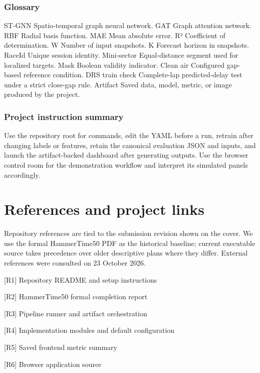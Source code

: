 \documentclass[11pt,a4paper,oneside]{report}
\begin{document}
\subsection*{Glossary}

ST-GNN  Spatio-temporal graph neural network. GAT  Graph attention network. RBF  Radial basis function. MAE  Mean absolute error. R²  Coefficient of determination. W  Number of input snapshots. K  Forecast horizon in snapshots. RaceId  Unique session identity. Mini-sector  Equal-distance segment used for localized targets. Mask  Boolean validity indicator. Clean air  Configured gap-based reference condition. DRS train check  Complete-lap predicted-delay test under a strict close-gap rule. Artifact  Saved data, model, metric, or image produced by the project.

\subsection*{Project instruction summary}

Use the repository root for commands, edit the YAML before a run, retrain after changing labels or features, retain the canonical evaluation JSON and inputs, and launch the artifact-backed dashboard after generating outputs. Use the browser control room for the demonstration workflow and interpret its simulated panels accordingly.

\clearpage

\clearpage\chapter*{References and project links}

Repository references are tied to the submission revision shown on the cover. We use the formal HammerTime50 PDF as the historical baseline; current executable source takes precedence over older descriptive plans where they differ. External references were consulted on 23 October 2026.

[R1] Repository README and setup instructions

[R2] HammerTime50 formal completion report

[R3] Pipeline runner and artifact orchestration

[R4] Implementation modules and default configuration

[R5] Saved frontend metric summary

[R6] Browser application source
\end{document}

